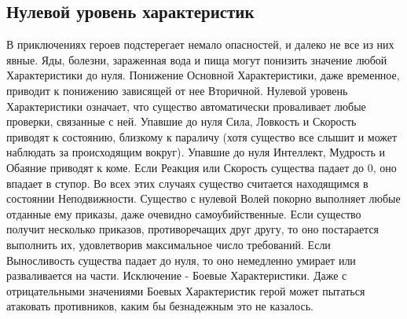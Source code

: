 \subsection{Нулевой уровень характеристик}
В приключениях героев подстерегает немало опасностей, и далеко не все из них явные. Яды, болезни, зараженная вода и пища могут понизить значение любой Характеристики до нуля. Понижение Основной Характеристики, даже временное, приводит к понижению зависящей от нее Вторичной.
\newline Нулевой уровень Характеристики означает, что существо автоматически проваливает любые проверки, связанные с ней. Упавшие до нуля Сила, Ловкость и Скорость приводят к состоянию, близкому к параличу (хотя существо все слышит и может наблюдать за происходящим вокруг). Упавшие до нуля Интеллект, Мудрость и Обаяние приводят к коме. Если Реакция или Скорость существа падает до 0, оно впадает в ступор. Во всех этих случаях существо считается находящимся в состоянии Неподвижности. Существо с нулевой Волей покорно выполняет любые отданные ему приказы, даже очевидно самоубийственные. Если существо получит несколько приказов, противоречащих друг другу, то оно постарается выполнить их, удовлетворив максимальное число требований. Если Выносливость существа падает до нуля, то оно немедленно умирает или разваливается на части.
\newline Исключение - Боевые Характеристики. Даже с отрицательными значениями Боевых Характеристик герой может пытаться атаковать противников, каким бы безнадежным это не казалось.
